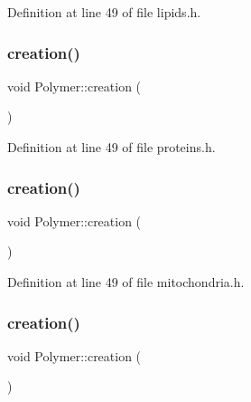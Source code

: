 Definition at line 49 of file lipids.\+h.

\mbox{\label{class_polymer_a1daba3eb2ba8428bf2f3e814668b155f}} 
\subsubsection{\texorpdfstring{creation()}{creation()}\hspace{0.1cm}{\footnotesize\ttfamily [4/10]}}
{\footnotesize\ttfamily void Polymer\+::creation (\begin{DoxyParamCaption}{ }\end{DoxyParamCaption})\hspace{0.3cm}{\ttfamily [inline]}}



Definition at line 49 of file proteins.\+h.

\mbox{\label{class_polymer_a1daba3eb2ba8428bf2f3e814668b155f}} 
\subsubsection{\texorpdfstring{creation()}{creation()}\hspace{0.1cm}{\footnotesize\ttfamily [5/10]}}
{\footnotesize\ttfamily void Polymer\+::creation (\begin{DoxyParamCaption}{ }\end{DoxyParamCaption})\hspace{0.3cm}{\ttfamily [inline]}}



Definition at line 49 of file mitochondria.\+h.

\mbox{\label{class_polymer_a1daba3eb2ba8428bf2f3e814668b155f}} 
\subsubsection{\texorpdfstring{creation()}{creation()}\hspace{0.1cm}{\footnotesize\ttfamily [6/10]}}
{\footnotesize\ttfamily void Polymer\+::creation (\begin{DoxyParamCaption}{ }\end{DoxyParamCaption})\hspace{0.3cm}{\ttfamily [inline]}}




